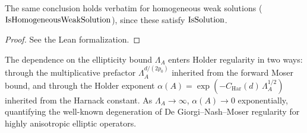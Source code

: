 \begin{corollary}
\label{cor:holder_Moser_of_homogeneousWeakSolution}
\leanok
{}
The same conclusion holds verbatim for homogeneous weak solutions
($\mathrm{IsHomogeneousWeakSolution}$), since these satisfy
$\mathrm{IsSolution}$.
\end{corollary}

\begin{proof}
\leanok
{}
See the Lean formalization.
\end{proof}

\begin{remark}
The dependence on the ellipticity bound $\Lambda_A$ enters Holder regularity
in two ways: through the multiplicative prefactor $\Lambda_A^{d/(2p_0)}$
inherited from the forward Moser bound, and through the Holder exponent
$\alpha(A) = \exp(-C_{\mathrm{Har}}(d)\,\Lambda_A^{1/2})$ inherited from the
Harnack constant. As $\Lambda_A \to \infty$, $\alpha(A) \to 0$ exponentially,
quantifying the well-known degeneration of De Giorgi--Nash--Moser regularity
for highly anisotropic elliptic operators.
\end{remark}
